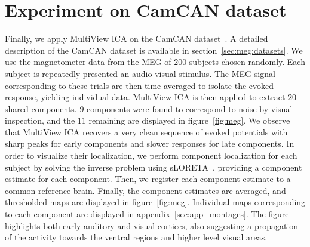 \section{Experiment on CamCAN dataset}
Finally, we apply MultiView ICA on the CamCAN
dataset~\cite{taylor2017cambridge}. A detailed description of the CamCAN dataset
is available in section~\ref{sec:meg:datasets}. We use the magnetometer data from the MEG of
$200$ subjects chosen randomly.
%
Each subject is repeatedly presented an audio-visual stimulus. 
%
The MEG signal corresponding to these trials are then time-averaged to isolate the evoked response, yielding individual data.
%
MultiView ICA is then applied to extract $20$ shared components.
%
$9$ components were found to correspond to noise by visual inspection, and the $11$ remaining are displayed in figure~\ref{fig:meg}.
%
We observe that MultiView ICA recovers a very clean sequence of evoked potentials with sharp peaks
for early components and slower responses for late components.
%
In order to visualize their localization, we perform component localization for each subject by solving the inverse problem using sLORETA~\cite{pascual2002standardized}, providing a component estimate for each component.
%
Then, we register each component estimate to a common reference brain.
%
Finally, the component estimates are averaged, and thresholded maps are displayed in figure~\ref{fig:meg}.
%
Individual maps corresponding to each component are displayed in appendix~\ref{sec:app_montages}.
The figure highlights both early auditory and visual cortices, also suggesting a propagation
of the activity towards the ventral regions and higher level visual areas.

